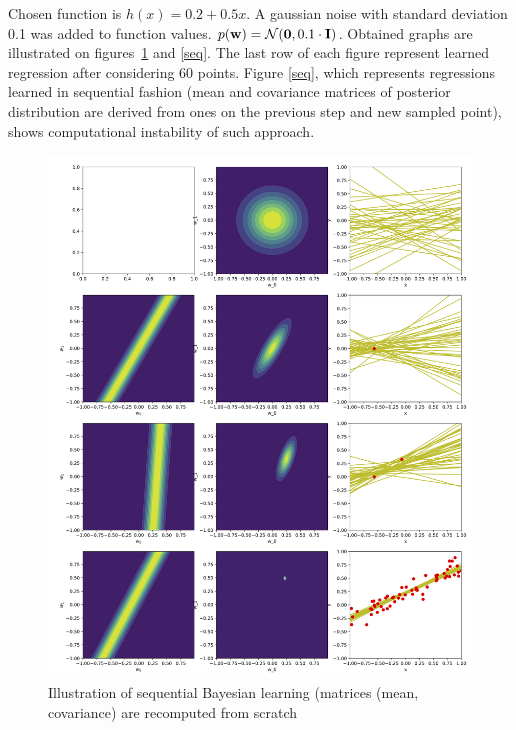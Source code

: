 \documentclass{article}
\newcommand{\mw}{\bold{w}}
\newcommand{\mI}{\bold{I}}
\begin{document}
Chosen function is $h(x) = 0.2 + 0.5 x $. A gaussian noise with standard deviation 0.1 was added to function values. $p(\mw) = \mathcal{N}(\bold{0}, 0.1 \cdot \mI)$. Obtained graphs are illustrated on figures~\ref{from_scr} and \ref{seq}. The last row of each figure represent learned regression after considering 60 points. Figure \ref{seq}, which represents regressions learned in sequential fashion (mean and covariance matrices of posterior distribution are derived from ones on the previous step and new sampled point), shows computational instability of such approach. 

\begin{figure}
	\centering
	\includegraphics[width=\textwidth]{bayesL.jpg}
	\caption{Illustration of sequential Bayesian learning (matrices (mean, covariance) are recomputed from scratch}
	\label{from_scr}
\end{figure}
\end{document}
